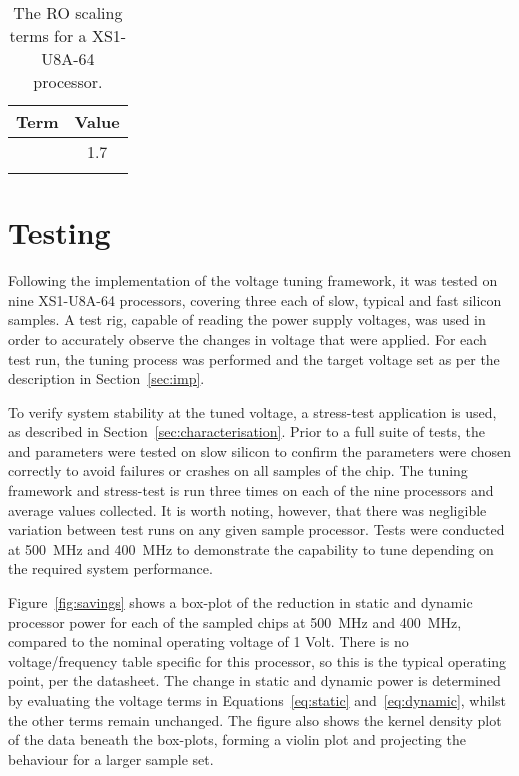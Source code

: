 \documentclass[a4paper,twocolumn,DIV=16]{scrartcl}
\begin{document}
\begin{table}[h!]
\centering
\begin{tabular}{|c|c|}
\hline 
\textbf{Term} & \textbf{Value}
\\ \hline
 & 1.7
\\ \hline
 & 
\\ \hline
\end{tabular}
\caption{The RO scaling terms for a XS1-U8A-64 processor.}
\label{tab:characterisation}
\end{table}


\section{Testing}
\label{sec:test}

Following the implementation of the voltage tuning framework, it was tested on
nine XS1-U8A-64 processors, covering three each of slow, typical and fast
silicon samples. A test rig, capable of reading the power supply voltages, was
used in order to accurately observe the changes in voltage that were applied.
For each test run, the tuning process was performed and the target voltage set
as per the description in Section~\ref{sec:imp}.

To verify system stability at the tuned voltage, a stress-test application is
used, as described in Section~\ref{sec:characterisation}. Prior to a full suite
of tests, the  and  parameters were tested on slow silicon to confirm
the parameters were chosen correctly to avoid failures or crashes on all samples
of the chip. The tuning framework and stress-test is run three times on each of
the nine processors and average values collected. It is worth noting, however,
that there was negligible variation between test runs on any given sample
processor. Tests were conducted at 500~MHz and 400~MHz to demonstrate the
capability to tune depending on the required system performance.

Figure~\ref{fig:savings} shows a box-plot of the reduction in static and dynamic
processor power for each of the sampled chips at 500~MHz and 400~MHz, compared
to the nominal operating voltage of 1 Volt. There is no voltage/frequency table
specific for this processor, so this is the typical operating point, per the
datasheet. The change in static and dynamic power is determined by evaluating
the voltage terms in Equations~\ref{eq:static} and~\ref{eq:dynamic}, whilst the
other terms remain unchanged. The figure also shows the kernel density plot of
the data beneath the box-plots, forming a violin plot and projecting the
behaviour for a larger sample set.
\end{document}
